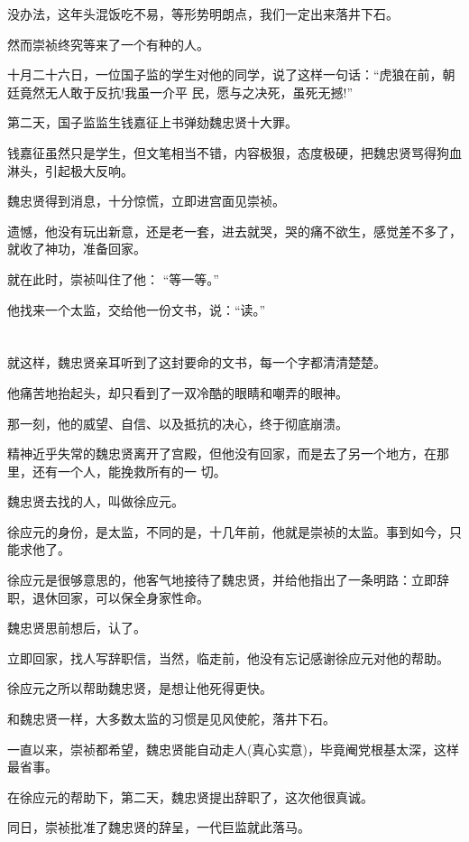 \documentclass[11pt,a4paper,onecolumn]{article}
\begin{document}
没办法，这年头混饭吃不易，等形势明朗点，我们一定出来落井下石。

然而崇祯终究等来了一个有种的人。

十月二十六日，一位国子监的学生对他的同学，说了这样一句话：``虎狼在前，朝廷竟然无人敢于反抗!我虽一介平
民，愿与之决死，虽死无撼!''

第二天，国子监监生钱嘉征上书弹劾魏忠贤十大罪。

钱嘉征虽然只是学生，但文笔相当不错，内容极狠，态度极硬，把魏忠贤骂得狗血淋头，引起极大反响。

魏忠贤得到消息，十分惊慌，立即进宫面见崇祯。

遗憾，他没有玩出新意，还是老一套，进去就哭，哭的痛不欲生，感觉差不多了，就收了神功，准备回家。

就在此时，崇祯叫住了他： ``等一等。''

他找来一个太监，交给他一份文书，说：``读。''

\section[\thesection]{}

就这样，魏忠贤亲耳听到了这封要命的文书，每一个字都清清楚楚。

他痛苦地抬起头，却只看到了一双冷酷的眼睛和嘲弄的眼神。

那一刻，他的威望、自信、以及抵抗的决心，终于彻底崩溃。

精神近乎失常的魏忠贤离开了宫殿，但他没有回家，而是去了另一个地方，在那里，还有一个人，能挽救所有的一
切。

魏忠贤去找的人，叫做徐应元。

徐应元的身份，是太监，不同的是，十几年前，他就是崇祯的太监。事到如今，只能求他了。

徐应元是很够意思的，他客气地接待了魏忠贤，并给他指出了一条明路：立即辞职，退休回家，可以保全身家性命。

魏忠贤思前想后，认了。

立即回家，找人写辞职信，当然，临走前，他没有忘记感谢徐应元对他的帮助。

徐应元之所以帮助魏忠贤，是想让他死得更快。

和魏忠贤一样，大多数太监的习惯是见风使舵，落井下石。

一直以来，崇祯都希望，魏忠贤能自动走人(真心实意)，毕竟阉党根基太深，这样最省事。

在徐应元的帮助下，第二天，魏忠贤提出辞职了，这次他很真诚。

同日，崇祯批准了魏忠贤的辞呈，一代巨监就此落马。
\end{document}
